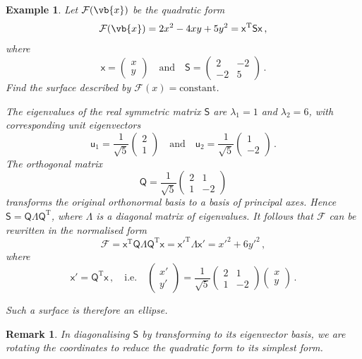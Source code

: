 \documentclass{article}
\theoremstyle{plain}\theoremheaderfont{\normalfont\itshape}\theorembodyfont{\rmfamily}\theoremseparator{.}\newtheorem*{rem}{Remark}\newtheorem*{ex}{Example}\newtheorem*{proof}{Proof}\newtheorem*{altp}{Alternative proof}
\theoremstyle{plain}\theoremheaderfont{\normalfont\bfseries}\theorembodyfont{\rmfamily}\theoremseparator{.}\newtheorem{thm}{Theorem}[section]\newtheorem{lem}[thm]{Lemma}\newtheorem{prop}[thm]{Proposition}\newtheorem*{cor}{Corollary}\newtheorem{defn}[thm]{Definition}\newtheorem{clm}[thm]{Claim}\newtheorem{clminproof}{Claim}
\theoremstyle{break}\theoremheaderfont{\normalfont\itshape}\theorembodyfont{\rmfamily}\theoremseparator{.\medskip}\newtheorem*{proofskip}{Proof}\newtheorem*{exs}{Examples}\newtheorem*{rems}{Remarks}
\theoremstyle{break}\theoremheaderfont{\normalfont\bfseries}\theorembodyfont{\rmfamily}\theoremseparator{.\medskip}\newtheorem{lemskip}[thm]{Lemma}\newtheorem{defnskip}[thm]{Definition}\newtheorem{propskip}[thm]{Proposition}\newtheorem{thmskip}[thm]{Theorem}
\numberwithin{equation}{section}
\newcommand{\tp}{^\mathrm{T}}
\begin{document}
	\begin{ex}
		Let \(\mathcal{F}(\vb{x})\) be the quadratic form
		\[\mathcal{F}(\vb{x})=2x^2-4xy+5y^2=\mathsf{x}\tp\mathsf{Sx}\,,\]
		where
		\[\mathsf{x}=\begin{pmatrix}
			x \\ y
		\end{pmatrix}\quad\text{and}\quad\mathsf{S}=\begin{pmatrix}
		2 & -2\\ -2 & 5
		\end{pmatrix}\,.\]
		Find the surface described by \(\mathcal{F}(x)=\text{constant}\).
		
		The eigenvalues of the real symmetric matrix \(\mathsf{S}\) are \(\lambda_1=1\) and \(\lambda_2=6\), with corresponding unit eigenvectors
		\[\mathsf{u}_1=\frac{1}{\sqrt{5}}\begin{pmatrix}
			2 \\ 1
		\end{pmatrix}\quad\text{and}\quad\mathsf{u}_2=\frac{1}{\sqrt{5}}\begin{pmatrix}
			1 \\ -2
		\end{pmatrix}\,.\]
		The orthogonal matrix
		\[\mathsf{Q}=\frac{1}{\sqrt{5}}\begin{pmatrix}
			2 & 1 \\ 1 & -2
		\end{pmatrix}\]
		transforms the original orthonormal basis to a basis of principal axes. Hence \(\mathsf{S=Q\Lambda Q}\tp\), where \(\mathsf{\Lambda}\) is a diagonal matrix of eigenvalues. It follows that \(\mathcal{F}\) can be rewritten in the normalised form
		\[\mathcal{F}=\mathsf{x}\tp\mathsf{Q\Lambda Q}\tp\mathsf{x}=\mathsf{x'}\tp\mathsf{\Lambda}\mathsf{x'}=x'^2+6y'^2\,,\]
		where
		\[\mathsf{x'=Q}\tp\mathsf{x}\,,\quad\text{i.e.}\quad\begin{pmatrix}
			x' \\ y'
		\end{pmatrix}=\frac{1}{\sqrt{5}}\begin{pmatrix}
			2 & 1 \\ 1 & -2
		\end{pmatrix}\begin{pmatrix}
			x \\ y
		\end{pmatrix}\,.\]
		
		Such a surface is therefore an ellipse.
	\end{ex}

	\begin{rem}
		In diagonalising \(\mathsf{S}\) by transforming to its eigenvector basis, we are rotating the coordinates to reduce the quadratic form to its simplest form.
	\end{rem}
\end{document}
